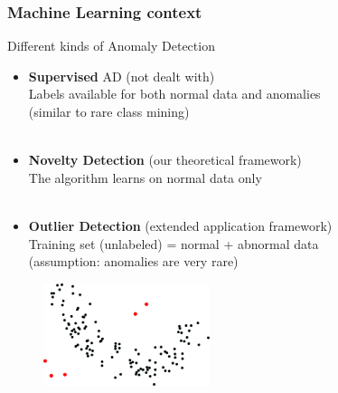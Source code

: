 \documentclass[9pt]{beamer}
\newcommand\red{\color{red} }
\begin{document}
\begin{frame}
\frametitle{Machine Learning context}
\begin{block}{Different kinds of Anomaly Detection}
\begin{itemize}
\item \textbf{Supervised} AD {\red (not dealt with)}\\
Labels available for both normal data and anomalies\\
(similar to rare class mining)\\~\\

\item \textbf{Novelty Detection} {\red (our theoretical framework)}\\
The algorithm learns on normal data only\\~\\

\item \textbf{Outlier Detection} {\red (extended application framework)}\\
Training set (unlabeled) = normal + abnormal data \\
(assumption: anomalies are very rare)
\end{itemize}
\end{block}
\begin{figure}
\includegraphics[height=3cm]{sourcefigs/AD_intro.pdf}
\end{figure}
\end{frame}
\end{document}
